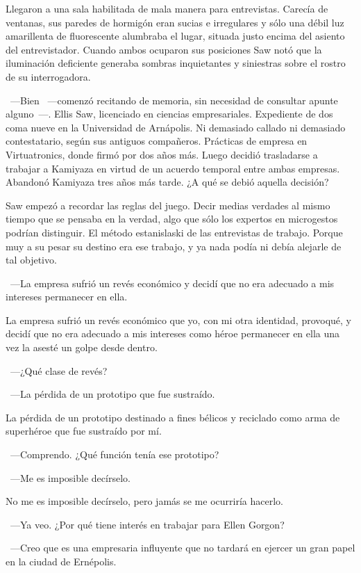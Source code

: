 Llegaron a una sala habilitada de mala manera para entrevistas. Carecía de ventanas, sus paredes de hormigón eran sucias e irregulares y sólo una débil luz amarillenta de fluorescente alumbraba el lugar, situada justo encima del asiento del entrevistador. Cuando ambos ocuparon sus posiciones Saw notó que la iluminación deficiente generaba sombras inquietantes y siniestras sobre el rostro de su interrogadora.

~---Bien ~---comenzó recitando de memoria, sin necesidad de consultar apunte alguno~---. Ellis Saw, licenciado en ciencias empresariales. Expediente de dos coma nueve en la Universidad de Arnápolis. Ni demasiado callado ni demasiado contestatario, según sus antiguos compañeros. Prácticas de empresa en Virtuatronics, donde firmó por dos años más. Luego decidió trasladarse a trabajar a Kamiyaza en virtud de un acuerdo temporal entre ambas empresas. Abandonó Kamiyaza tres años más tarde. ¿A qué se debió aquella decisión?

Saw empezó a recordar las reglas del juego. Decir medias verdades al mismo tiempo que se pensaba en la verdad, algo que sólo los expertos en microgestos podrían distinguir. El método estanislaski de las entrevistas de trabajo. Porque muy a su pesar su destino era ese trabajo, y ya nada podía ni debía alejarle de tal objetivo.

~---La empresa sufrió un revés económico y decidí que no era adecuado a mis intereses permanecer en ella.

La empresa sufrió un revés económico que yo, con mi otra identidad, provoqué, y decidí que no era adecuado a mis intereses como héroe permanecer en ella una vez la asesté un golpe desde dentro.

~---¿Qué clase de revés?

~---La pérdida de un prototipo que fue sustraído.

La pérdida de un prototipo destinado a fines bélicos y reciclado como arma de superhéroe que fue sustraído por mí.

~---Comprendo. ¿Qué función tenía ese prototipo?

~---Me es imposible decírselo.

No me es imposible decírselo, pero jamás se me ocurriría hacerlo.

~---Ya veo. ¿Por qué tiene interés en trabajar para Ellen Gorgon?

~---Creo que es una empresaria influyente que no tardará en ejercer un gran papel en la ciudad de Ernépolis.

